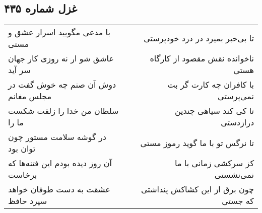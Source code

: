 \begin{center}
\section*{غزل شماره ۴۳۵}
\label{sec:sh435}
\begin{longtable}{l p{0.5cm} r}
با مدعی مگویید اسرار عشق و مستی
&&
تا بی‌خبر بمیرد در درد خودپرستی
\\
عاشق شو ار نه روزی کار جهان سر آید
&&
ناخوانده نقش مقصود از کارگاه هستی
\\
دوش آن صنم چه خوش گفت در مجلس مغانم
&&
با کافران چه کارت گر بت نمی‌پرستی
\\
سلطان من خدا را زلفت شکست ما را
&&
تا کی کند سیاهی چندین درازدستی
\\
در گوشه سلامت مستور چون توان بود
&&
تا نرگس تو با ما گوید رموز مستی
\\
آن روز دیده بودم این فتنه‌ها که برخاست
&&
کز سرکشی زمانی با ما نمی‌نشستی
\\
عشقت به دست طوفان خواهد سپرد حافظ
&&
چون برق از این کشاکش پنداشتی که جستی
\\
\end{longtable}
\end{center}
